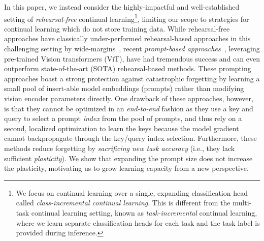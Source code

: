 In this paper, we instead consider the highly-impactful and well-established setting of \emph{rehearsal-free} continual learning\cite{wang2022learning,wang2022dualprompt,smith2021abd,smith2022closer,li2016learning}\footnote{We focus on continual learning over a single, expanding classification head called \textit{class-incremental continual learning}. This is different from the multi-task continual learning setting, known as \textit{task-incremental} continual learning, where we learn separate classification heads for each task and the task label is provided during inference.\cite{hsu2018re,van2019three}}, limiting our scope to strategies for continual learning which do not store training data. While rehearsal-free approaches have classically under-performed rehearsal-based approaches in this challenging setting by wide-margins~\cite{smith2022closer}, recent \emph{prompt-based approaches}~\cite{wang2022learning,wang2022dualprompt}, leveraging pre-trained Vision transformers (ViT), have had tremendous success and can even outperform state-of-the-art (SOTA) rehearsal-based methods. These prompting approaches boast a strong protection against catastrophic forgetting by learning a small pool of insert-able model embeddings (prompts) rather than modifying vision encoder parameters directly. One drawback of these approaches, however, is that they cannot be optimized in an \emph{end-to-end} fashion as they use a key and query to select a prompt \emph{index} from the pool of prompts, and thus rely on a second, localized optimization to learn the keys because the model gradient cannot backpropagate through the key/query index selection.
Furthermore, these methods reduce forgetting by \emph{sacrificing new task accuracy} (i.e., they lack sufficient \emph{plasticity}). We show that expanding the prompt size does not increase the plasticity, motivating us to grow learning capacity from a new perspective.



